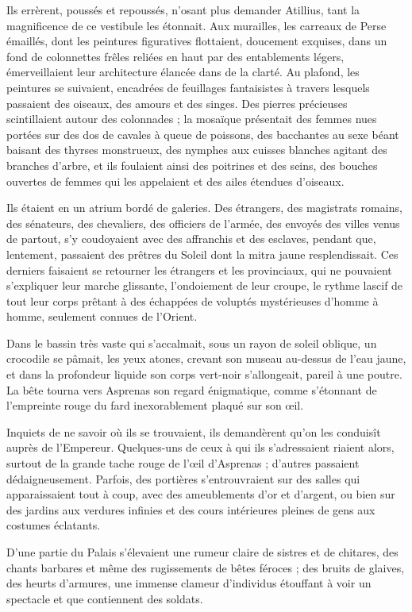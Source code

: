 \documentclass[a4paper, 11pt, oneside, polutonikogreek, french]{article}
\begin{document}
Ils errèrent, poussés et repoussés, n'osant plus demander Atillius, tant la magnificence de ce vestibule les étonnait. Aux murailles, les carreaux de Perse émaillés, dont les peintures figuratives flottaient, doucement exquises, dans un fond de colonnettes frêles reliées en haut par des entablements légers, émerveillaient leur architecture élancée dans de la clarté. Au plafond, les peintures se suivaient, encadrées de feuillages fantaisistes à travers lesquels passaient des oiseaux, des amours et des singes. Des pierres précieuses scintillaient autour des colonnades ; la mosaïque présentait des femmes nues portées sur des dos de cavales à queue de poissons, des bacchantes au sexe béant baisant des thyrses monstrueux, des nymphes aux cuisses blanches agitant des branches d'arbre, et ils foulaient ainsi des poitrines et des seins, des bouches ouvertes de femmes qui les appelaient et des ailes étendues d'oiseaux.

Ils étaient en un atrium bordé de galeries. Des étrangers, des magistrats romains, des sénateurs, des chevaliers, des officiers de l'armée, des envoyés des villes venus de partout, s'y coudoyaient avec des affranchis et des esclaves, pendant que, lentement, passaient des prêtres du Soleil dont la mitra jaune resplendissait. Ces derniers faisaient se retourner les étrangers et les provinciaux, qui ne pouvaient s'expliquer leur marche glissante, l'ondoiement de leur croupe, le rythme lascif de tout leur corps prêtant à des échappées de voluptés mystérieuses d'homme à homme, seulement connues de l'Orient.

Dans le bassin très vaste qui s'accalmait, sous un rayon de soleil oblique, un crocodile se pâmait, les yeux atones, crevant son museau au-dessus de l'eau jaune, et dans la profondeur liquide son corps vert-noir s'allongeait, pareil à une poutre. La bête tourna vers Asprenas son regard énigmatique, comme s'étonnant de l'empreinte rouge du fard inexorablement plaqué sur son œil.

Inquiets de ne savoir où ils se trouvaient, ils demandèrent qu'on les conduisît auprès de l'Empereur. Quelques-uns de ceux à qui ils s'adressaient riaient alors, surtout de la grande tache rouge de l'œil d'Asprenas ; d'autres passaient dédaigneusement. Parfois, des portières s'entrouvraient sur des salles qui apparaissaient tout à coup, avec des ameublements d'or et d'argent, ou bien sur des jardins aux verdures infinies et des cours intérieures pleines de gens aux costumes éclatants.

D'une partie du Palais s'élevaient une rumeur claire de sistres et de chitares, des chants barbares et même des rugissements de bêtes féroces ; des bruits de glaives, des heurts d'armures, une immense clameur d'individus étouffant à voir un spectacle et que contiennent des soldats.
\end{document}
